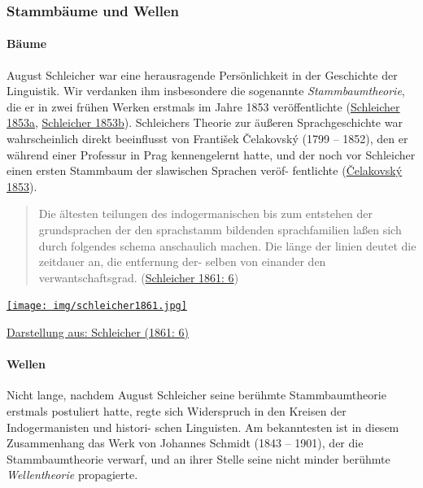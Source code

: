 \subsubsection{Stammbäume und Wellen}

\paragraph{Bäume}

August Schleicher war eine herausragende Persönlichkeit in der
Geschichte der Linguistik. Wir verdanken ihm insbesondere die sogenannte
\emph{Stammbaumtheorie}, die er in zwei frühen Werken erstmals im Jahre
1853 veröffentlichte
(\href{http://bibliography.lingpy.org?key=Schleicher1853}{Schleicher
1853a},
\href{http://bibliography.lingpy.org?key=Schleicher1853a}{Schleicher
1853b}). Schleichers Theorie zur äußeren Sprachgeschichte war
wahrscheinlich direkt beeinflusst von František Čelakovský (1799 --
1852), den er während einer Professur in Prag kennengelernt hatte, und
der noch vor Schleicher einen ersten Stammbaum der slawischen Sprachen
veröf- fentlichte
(\href{http://bibliography.lingpy.org?key=Celakovsky1853}{Čelakovský
1853}).






\begin{quote}
Die ältesten teilungen des indogermanischen bis zum entstehen der
grundsprachen der den sprachstamm bildenden sprachfamilien laßen sich
durch folgendes schema anschaulich machen. Die länge der linien deutet
die zeitdauer an, die entfernung der- selben von einander den
verwantschaftsgrad.
(\href{http://bibliography.lingpy.org?key=Schleicher1861}{Schleicher
1861: 6})
\end{quote}






\href{img/schleicher1861.jpg}{\texttt{[image: img/schleicher1861.jpg]}}

\href{http://bibliography.lingpy.org?key=Schleicher1861}{Darstellung
aus: Schleicher (1861: 6)}





\paragraph{Wellen}

Nicht lange, nachdem August Schleicher seine berühmte Stammbaumtheorie
erstmals postuliert hatte, regte sich Widerspruch in den Kreisen der
Indogermanisten und histori- schen Linguisten. Am bekanntesten ist in
diesem Zusammenhang das Werk von Johannes Schmidt (1843 -- 1901), der
die Stammbaumtheorie verwarf, und an ihrer Stelle seine nicht minder
berühmte \emph{Wellentheorie} propagierte.






